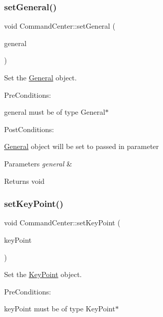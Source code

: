 \subsubsection{\texorpdfstring{set\+General()}{setGeneral()}}
{\footnotesize\ttfamily void Command\+Center\+::set\+General (\begin{DoxyParamCaption}\item[{\hyperlink{classGeneral}{General} $\ast$}]{general }\end{DoxyParamCaption})}



Set the \hyperlink{classGeneral}{General} object. 

Pre\+Conditions\+:
\begin{DoxyItemize}
\item general must be of type General$\ast$
\end{DoxyItemize}

Post\+Conditions\+:
\begin{DoxyItemize}
\item \hyperlink{classGeneral}{General} object will be set to passed in parameter
\end{DoxyItemize}


\begin{DoxyParams}{Parameters}
{\em general} & \\
\hline
\end{DoxyParams}
\begin{DoxyReturn}{Returns}
void 
\end{DoxyReturn}
\mbox{\label{classCommandCenter_a585052e0a546ce307090c43b95dad5fa}} 
\subsubsection{\texorpdfstring{set\+Key\+Point()}{setKeyPoint()}}
{\footnotesize\ttfamily void Command\+Center\+::set\+Key\+Point (\begin{DoxyParamCaption}\item[{\hyperlink{classKeyPoint}{Key\+Point} $\ast$}]{key\+Point }\end{DoxyParamCaption})}



Set the \hyperlink{classKeyPoint}{Key\+Point} object. 

Pre\+Conditions\+:
\begin{DoxyItemize}
\item key\+Point must be of type Key\+Point$\ast$
\end{DoxyItemize}

